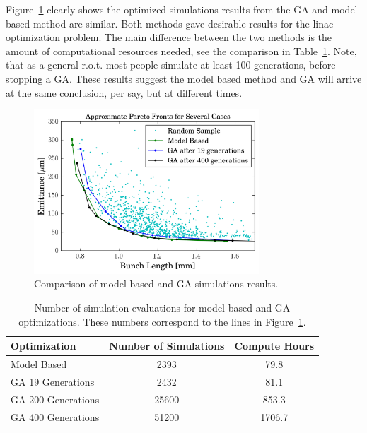 Figure~\ref{fig:GAvsModel} clearly shows the optimized simulations results from 
the GA and model based method are similar. Both methods gave desirable 
results for the linac optimization problem. 
The main difference between the two methods is the amount of computational 
resources needed, see the comparison in Table~\ref{tab:optcompare}.
Note, that as a general r.o.t. most people simulate at least 100 generations, 
before stopping a GA.
These results suggest the model based method and GA will arrive at 
the same conclusion, per say, but at different times.
\begin{figure}
	\centering
	\includegraphics[width=0.75\textwidth]{./images/model_vs_ga}
	\caption{Comparison of model based and GA simulations results.}
	\label{fig:GAvsModel}
\end{figure}
\begin{table}[h] %
	\caption{Number of simulation evaluations for model based and GA optimizations.
	These numbers correspond to the lines in Figure~\ref{fig:GAvsModel}.}
	\label{tab:optcompare}
	\begin{center}
		\begin{tabular}{lcc}
			\toprule
			\toprule
			\textbf{Optimization} & \textbf{Number of Simulations} & \textbf{Compute Hours} \\
			\midrule
			Model Based  		& 2393  & 79.8 \\
			GA 19 Generations 	& 2432  & 81.1 \\
			GA 200 Generations 	& 25600 & 853.3\\
			GA 400 Generations 	& 51200 & 1706.7\\
			\bottomrule
		\end{tabular}
	\end{center}
\end{table}


